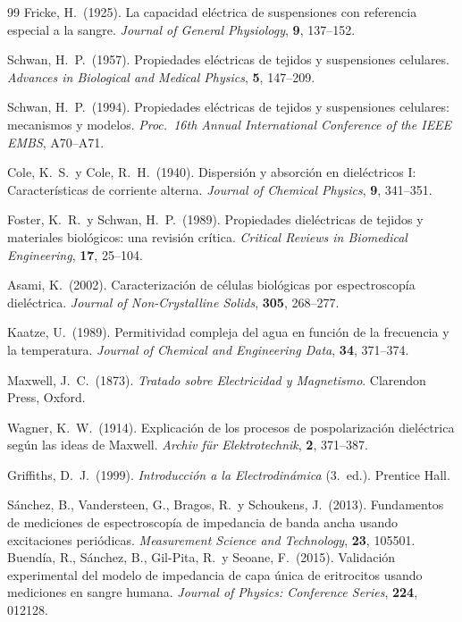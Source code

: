 \documentclass[12pt]{article}
\begin{document}
\begin{thebibliography}{99}
Fricke, H.\ (1925).
La capacidad el\'ectrica de suspensiones con referencia especial a la sangre.
\textit{Journal of General Physiology}, \textbf{9}, 137--152.

Schwan, H.\ P.\ (1957).
Propiedades el\'ectricas de tejidos y suspensiones celulares.
\textit{Advances in Biological and Medical Physics}, \textbf{5}, 147--209.

Schwan, H.\ P.\ (1994).
Propiedades el\'ectricas de tejidos y suspensiones celulares: mecanismos y modelos.
\textit{Proc.\ 16th Annual International Conference of the IEEE EMBS}, A70--A71.


Cole, K.\ S.\ y Cole, R.\ H.\ (1940).
Dispersi\'on y absorci\'on en diel\'ectricos {I}: Caracter\'isticas de corriente alterna.
\textit{Journal of Chemical Physics}, \textbf{9}, 341--351.

Foster, K.\ R.\ y Schwan, H.\ P.\ (1989).
Propiedades diel\'ectricas de tejidos y materiales biol\'ogicos: una revisi\'on cr\'itica.
\textit{Critical Reviews in Biomedical Engineering}, \textbf{17}, 25--104.

Asami, K.\ (2002).
Caracterizaci\'on de c\'elulas biol\'ogicas por espectroscop\'ia diel\'ectrica.
\textit{Journal of Non-Crystalline Solids}, \textbf{305}, 268--277.

Kaatze, U.\ (1989).
Permitividad compleja del agua en funci\'on de la frecuencia y la temperatura.
\textit{Journal of Chemical and Engineering Data}, \textbf{34}, 371--374.

Maxwell, J.\ C.\ (1873).
\textit{Tratado sobre Electricidad y Magnetismo}.
Clarendon Press, Oxford.

Wagner, K.\ W.\ (1914).
Explicaci\'on de los procesos de pospolarizaci\'on diel\'ectrica seg\'un las ideas de Maxwell.
\textit{Archiv f\"{u}r Elektrotechnik}, \textbf{2}, 371--387.

Griffiths, D.\ J.\ (1999).
\textit{Introducci\'on a la Electrodin\'amica} (3.\textordfeminine~ed.).
Prentice Hall.

S\'anchez, B., Vandersteen, G., Bragos, R.\ y Schoukens, J.\ (2013).
Fundamentos de mediciones de espectroscop\'ia de impedancia de banda ancha usando
excitaciones peri\'odicas.
\textit{Measurement Science and Technology}, \textbf{23}, 105501.
Buend\'ia, R., S\'anchez, B., Gil-Pita, R.\ y Seoane, F.\ (2015).
Validaci\'on experimental del modelo de impedancia de capa \'unica de eritrocitos usando
mediciones en sangre humana.
\textit{Journal of Physics: Conference Series}, \textbf{224}, 012128.


\end{thebibliography}
\end{document}
